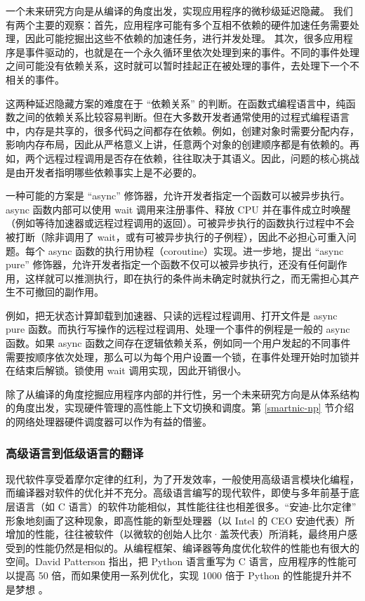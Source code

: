 一个未来研究方向是从编译的角度出发，实现应用程序的微秒级延迟隐藏。
我们有两个主要的观察：首先，应用程序可能有多个互相不依赖的硬件加速任务需要处理，因此可能挖掘出这些不依赖的加速任务，进行并发处理。
其次，很多应用程序是事件驱动的，也就是在一个永久循环里依次处理到来的事件。不同的事件处理之间可能没有依赖关系，这时就可以暂时挂起正在被处理的事件，去处理下一个不相关的事件。

这两种延迟隐藏方案的难度在于 ``依赖关系'' 的判断。在函数式编程语言中，纯函数之间的依赖关系比较容易判断。但在大多数开发者通常使用的过程式编程语言中，内存是共享的，很多代码之间都存在依赖。例如，创建对象时需要分配内存，影响内存布局，因此从严格意义上讲，任意两个对象的创建顺序都是有依赖的。再如，两个远程过程调用是否存在依赖，往往取决于其语义。因此，问题的核心挑战是由开发者指明哪些依赖事实上是不必要的。

一种可能的方案是 ``async'' 修饰器，允许开发者指定一个函数可以被异步执行。async 函数内部可以使用 wait 调用来注册事件、释放 CPU 并在事件成立时唤醒（例如等待加速器或远程过程调用的返回）。可被异步执行的函数执行过程中不会被打断（除非调用了 wait，或有可被异步执行的子例程），因此不必担心可重入问题。每个 async 函数的执行用协程（coroutine）实现。进一步地，提出 ``async pure'' 修饰器，允许开发者指定一个函数不仅可以被异步执行，还没有任何副作用，这样就可以推测执行，即在执行的条件尚未确定时就执行之，而无需担心其产生不可撤回的副作用。

例如，把无状态计算卸载到加速器、只读的远程过程调用、打开文件是 async pure 函数。而执行写操作的远程过程调用、处理一个事件的例程是一般的 async 函数。如果 async 函数之间存在逻辑依赖关系，例如同一个用户发起的不同事件需要按顺序依次处理，那么可以为每个用户设置一个锁，在事件处理开始时加锁并在结束后解锁。锁使用 wait 调用实现，因此开销很小。

除了从编译的角度挖掘应用程序内部的并行性，另一个未来研究方向是从体系结构的角度出发，实现硬件管理的高性能上下文切换和调度。第 \ref{smartnic-np} 节介绍的网络处理器硬件调度器可以作为有益的借鉴。

\iffalse
\subsubsection{高级语言到低级语言的翻译}
\label{future:high-to-low}

现代软件享受着摩尔定律的红利，为了开发效率，一般使用高级语言模块化编程，而编译器对软件的优化并不充分。高级语言编写的现代软件，即使与多年前基于底层语言（如 C 语言）的软件功能相似，其性能往往也相差很多。``安迪-比尔定律'' \cite{langchaozhidian} 形象地刻画了这种现象，即高性能的新型处理器（以 Intel 的 CEO 安迪代表）所增加的性能，往往被软件（以微软的创始人比尔·盖茨代表）所消耗，最终用户感受到的性能仍然是相似的。从编程框架、编译器等角度优化软件的性能也有很大的空间。David Patterson 指出，把 Python 语言重写为 C 语言，应用程序的性能可以提高 50 倍，而如果使用一系列优化，实现 1000 倍于 Python 的性能提升并不是梦想 \cite{python-to-c}。

